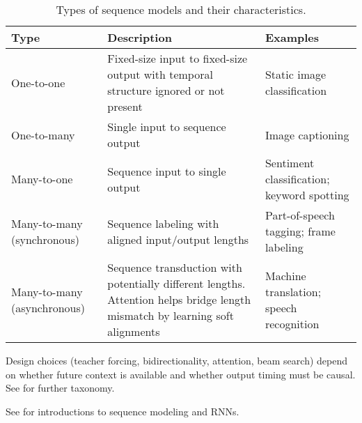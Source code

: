 \begin{table}[h]
\centering
\begin{tabularx}{0.9\textwidth}{p{} *{2}{X}}
\toprule
\textbf{Type} & \textbf{Description} & \textbf{Examples} \\
\midrule
One-to-one & Fixed-size input to fixed-size output with temporal structure ignored or not present & Static image classification \\
\midrule
One-to-many & Single input to sequence output & Image captioning \\
\midrule
Many-to-one & Sequence input to single output & Sentiment classification; keyword spotting \\
\midrule
Many-to-many (synchronous) & Sequence labeling with aligned input/output lengths & Part-of-speech tagging; frame labeling \\
\midrule
Many-to-many (asynchronous) & Sequence transduction with potentially different lengths. Attention helps bridge length mismatch by learning soft alignments \cite{Bahdanau2014} & Machine translation; speech recognition \\
\bottomrule
\end{tabularx}
\caption{Types of sequence models and their characteristics.}
\label{tab:sequence-types}
\end{table}

Design choices (teacher forcing, bidirectionality, attention, beam search) depend on whether future context is available and whether output timing must be causal. See \cite{D2LChapterRNN,WebRNNWikipedia} for further taxonomy.


See \cite{GoodfellowEtAl2016,Prince2023,Bishop2006,WebRNNWikipedia,WebDLBRNN,D2LChapterRNN} for introductions to sequence modeling and RNNs.

